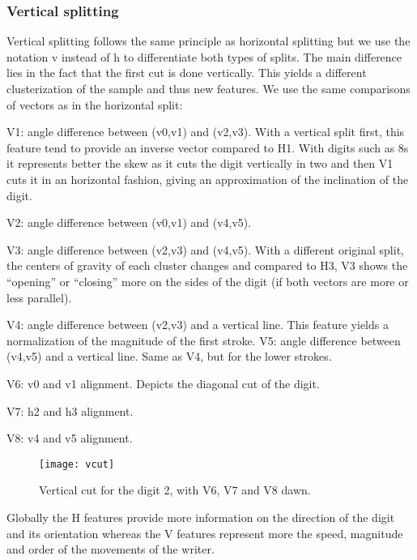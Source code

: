 \documentclass[a4paper]{article}
\begin{document}
{\subsubsection{Vertical splitting}

Vertical splitting follows the same principle as horizontal splitting but we use the notation v instead of h to differentiate both types of splits. The main difference lies in the fact that the first cut is done vertically. This yields a different clusterization of the sample and thus new features. We use the same comparisons of vectors as in the horizontal split:

\vspace{2mm}
\begin{listCustom}
	\item V1: angle difference between (v0,v1) and (v2,v3). With a vertical split first, this feature tend to provide an inverse vector compared to H1. With digits such as 8s it represents better the skew as it cuts the digit vertically in two and then V1 cuts it in an horizontal fashion, giving an approximation of the inclination of the digit. 
	\item V2: angle difference between (v0,v1) and (v4,v5).
	\item V3: angle difference between (v2,v3) and (v4,v5).  With a different original split, the centers of gravity of each cluster changes and compared to H3, V3 shows the “opening” or “closing” more on the sides of the digit (if both vectors are more or less parallel).
	\item V4: angle difference between (v2,v3) and a vertical line. This feature yields a normalization of the magnitude of the first stroke.
V5: angle difference between (v4,v5) and a vertical line. Same as V4, but for the lower strokes.
	\item V6: v0 and v1 alignment. Depicts the diagonal cut of the digit.
	\item V7: h2 and h3 alignment. 
	\item V8: v4 and v5 alignment.
\end{listCustom}
\vspace{1mm}

\begin{figure}[h!]
  \caption{Vertical cut for the digit 2, with V6, V7 and V8 dawn.}
  \centering
    \texttt{[image: vcut]}
\end{figure}

Globally the H features provide more information on the direction of the digit and its orientation whereas the V features represent more the speed, magnitude and order of the movements of the writer.

}
\end{document}
